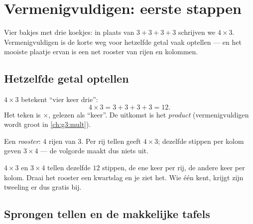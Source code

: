 \chapter{Vermenigvuldigen: eerste stappen}\label{ch:g2:mult}

Vier bakjes met drie koekjes: in plaats van $3 + 3 + 3 + 3$ schrijven
we $4 \times 3$. Vermenigvuldigen is de korte weg voor hetzelfde getal
vaak optellen --- en het mooiste plaatje ervan is een net rooster van
rijen en kolommen.

\section{Hetzelfde getal optellen}

\begin{definition}[Vermenigvuldigen]\label{def:g2:mult:def}
$4 \times 3$ betekent ``vier keer drie'':
\[
4 \times 3 = 3 + 3 + 3 + 3 = 12 .
\]
Het teken is $\times$, gelezen als ``keer''. De uitkomst is het
\emph{product} (vermenigvuldigen wordt groot in
\cref{ch:g3:mult}).
\end{definition}

\begin{omfigure}

{\small Een \emph{rooster}: $4$ rijen van $3$. Per rij tellen geeft
$4 \times 3$; dezelfde stippen per kolom geven $3 \times 4$ --- de
volgorde maakt dus niets uit.}
\end{omfigure}

\begin{example}\label{ex:g2:mult:order}
$4 \times 3$ en $3 \times 4$ tellen dezelfde $12$ stippen, de ene keer
per rij, de andere keer per kolom. Draai het rooster een kwartslag en je
ziet het. Wie één  kent, krijgt zijn tweeling er dus gratis bij.
\end{example}

\section{Sprongen tellen en de makkelijke tafels}

